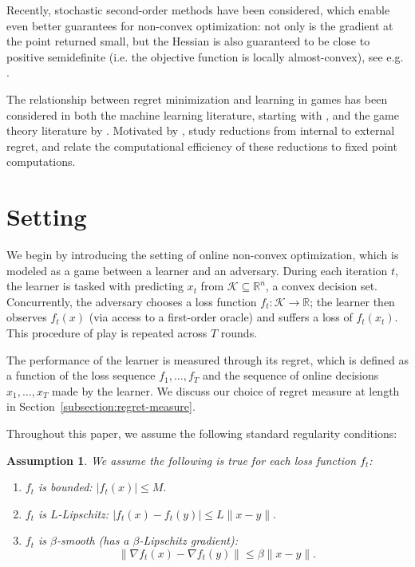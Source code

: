 \documentclass{article}
\def\reals{{\mathbb R}}
\def\norm#1{\mathopen\| #1 \mathclose\|}
\def\reals{{\mathbb R}}
\newcommand{\K}{\ensuremath{\mathcal K}}
\renewcommand{\K}{\mathcal{K}}
\newtheorem{assumption}[theorem]{Assumption}
\begin{document}
Recently, stochastic second-order methods have been considered, which enable even better guarantees for non-convex optimization: not only is the gradient at the point returned small, but the Hessian is also guaranteed to be close to positive semidefinite (i.e. the objective function is locally almost-convex), see e.g. \cite{newsamp,CarmonAGD,Lissa2,LiSSA2016}.

The relationship between regret minimization and learning in games has been considered in both the machine learning literature, starting with \cite{FreundSch1997}, and the game theory literature by \cite{hart2000simple}. Motivated by \cite{hart2000simple}, \cite{blumMansour} study reductions from internal to external regret, and \cite{NIPS2007_695} relate the computational efficiency of these reductions to fixed point computations. 

 
\section{Setting}

We begin by introducing the setting of online non-convex optimization, which is modeled as a game between a learner and an adversary. During each iteration $t$, the learner is tasked with predicting $x_t$ from $\K \subseteq \reals^n$, a convex decision set. Concurrently, the adversary chooses a loss function $f_t: \K\to\reals$; the learner then observes $f_t(x)$ (via access to a first-order oracle) and suffers a loss of $f_t(x_t)$. This procedure of play is repeated across $T$ rounds.

The performance of the learner is measured through its regret, which is defined as a function of the loss sequence $f_1, \ldots, f_T$ and the sequence of online decisions $x_1, \ldots, x_T$ made by the learner. We discuss our choice of regret measure at length in Section~\ref{subsection:regret-measure}.

Throughout this paper, we assume the following standard regularity conditions:
\begin{assumption}\label{assumption:smooth}
We assume the following is true for each loss function $f_t$:
\begin{enumerate}
\item[(i)] $f_t$ is bounded:
$|f_t(x)| \leq M.$
\item[(ii)] $f_t$ is $L$-Lipschitz:
$|f_t(x)-f_t(y)| \leq L\|x-y\|.$
\item[(iii)] $f_t$ is $\beta$-smooth (has a $\beta$-Lipschitz gradient):
\[\norm{\nabla f_t(x) - \nabla f_t(y)} \leq \beta \norm{x - y}.\]
\end{enumerate}
\end{assumption}
\end{document}

